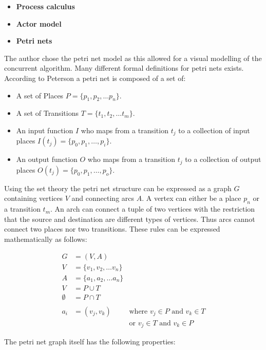 \begin{itemize}
    \item \textbf{Process calculus}
    \item \textbf{Actor model}
    \item \textbf{Petri nets}
\end{itemize} 

The author chose the petri net model as this allowed for a visual modelling of the concurrent algorithm. Many different formal definitions for petri nets exists. According to Peterson \cite{peterson} a petri net is composed of a set of:

\begin{itemize}
    \item A set of Places $P = \{p_1, p_2, \dots p_n\}$.
    \item A set of Transitions $T = \{t_1, t_2, \dots t_m\}$.
    \item An input function $I$ who maps from a transition $t_j$ to a collection of input places $I(t_j) = \{p_0, p_1, \dots, p_i\}$.
    \item An output function $O$ who maps from a transition $t_j$ to a collection of output places $O(t_j) = \{p_0, p_1, \dots, p_o\}$.
\end{itemize}

Using the set theory the petri net structure can be expressed as a graph $G$ containing vertices $V$ and connecting arcs $A$. A vertex can either be a place $p_n$ or a transition $t_m$. An arch can connect a tuple of two vertices with the restriction that the source and destination are different types of vertices. Thus arcs cannot connect two places nor two transitions. These rules can be expressed mathematically as follows:

\begin{align*}
G &= (V, A) \\
V &= \{v_1, v_2, \dots v_n\} \\
A &= \{a_1, a_2, \dots a_n\} \\
V &= P \cup T \\
\emptyset &=  P \cap T \\
\\
a_i &= (v_j, v_k) & \text{where } v_j \in P \text{ and } v_k \in T \\
    &             & \text{or } v_j \in T \text{ and } v_k \in P
\end{align*}

The petri net graph itself has the following properties:

